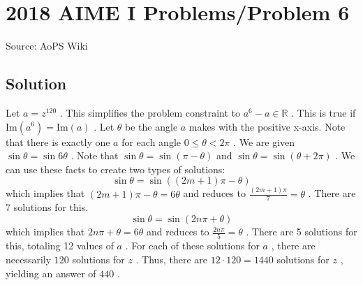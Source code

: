 \documentclass[12pt]{article}
\begin{document}
\section*{{2018 AIME I Problems/Problem 6}}
Source: AoPS Wiki

\subsection*{Solution}
Let $a=z^{120}$ . This simplifies the problem constraint to $a^6-a \in \mathbb{R}$ . This is true if $\text{Im}(a^6)=\text{Im}(a)$ . Let $\theta$ be the angle $a$ makes with the positive x-axis. Note that there is exactly one $a$ for each angle $0\le\theta<2\pi$ . We are given $\sin\theta = \sin{6\theta}$ . Note that $\sin \theta = \sin (\pi - \theta)$ and $\sin \theta = \sin (\theta + 2\pi)$ . We can use these facts to create two types of solutions: \[\sin \theta = \sin ((2m + 1)\pi - \theta)\] which implies that $(2m+1)\pi-\theta = 6\theta$ and reduces to $\frac{(2m + 1)\pi}{7} = \theta$ . There are 7 solutions for this. \[\sin \theta = \sin (2n\pi + \theta)\] which implies that $2n\pi+\theta=6\theta$ and reduces to $\frac{2n\pi}{5} = \theta$ . There are 5 solutions for this, totaling 12 values of $a$ . For each of these solutions for $a$ , there are necessarily $120$ solutions for $z$ . Thus, there are $12\cdot 120=1440$ solutions for $z$ , yielding an answer of $\boxed{440}$ .
\end{document}
